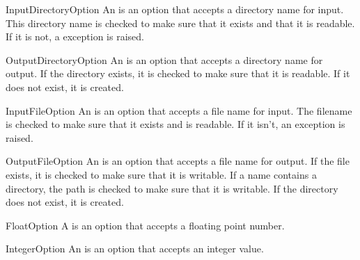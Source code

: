 \begin{classdesc}{InputDirectoryOption}{}
An  is an option that accepts a directory name
for input.
This directory name is checked to make sure that it exists and that it is
readable.  If it is not, a  exception is 
raised.
\end{classdesc}

\begin{classdesc}{OutputDirectoryOption}{}
An  is an option that accepts a directory name
for output.  If the directory exists, it is checked to make sure that it is
readable.  If it does not exist, it is created.
\end{classdesc}

\begin{classdesc}{InputFileOption}{}
An  is an option that accepts a file name for input.
The filename is checked to make sure that it exists and is readable.  If
it isn't, an  exception is raised.
\end{classdesc}

\begin{classdesc}{OutputFileOption}{}
An  is an option that accepts a file name for output.
If the file exists, it is checked to make sure that it is writable.  
If a name contains a directory, the path is checked to make sure that it is 
writable.  If the directory does not exist, it is created. 
\end{classdesc}

\begin{classdesc}{FloatOption}{}
A  is an option that accepts a floating point number.
\end{classdesc}

\begin{classdesc}{IntegerOption}{}
An  is an option that accepts an integer value.
\end{classdesc}

